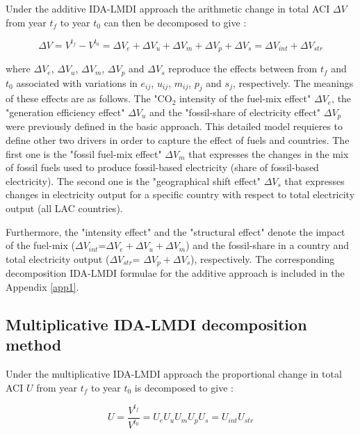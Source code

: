 \documentclass[energies,article,accept,moreauthors,12pt,a4paper]{mdpi} %
\begin{document}
Under the additive IDA-LMDI approach the arithmetic change in total ACI
$\Delta V$ from year $t_f$ to year $t_0$ can then be decomposed to give \cite{ang2016}:

\begin{equation}\label{dvtot}
  \Delta V   =  V^{t_f}- V^{t_0} = \Delta V_{e} + \Delta V_{u}+
  \Delta V_{m} + \Delta V_{p}  + \Delta V_{s} = \Delta V_{int}+\Delta V_{str}
\end{equation}

\noindent where $\Delta V_{e}$, $\Delta V_{u}$, $\Delta V_{m}$, $\Delta V_{p}$  and $\Delta V_{s}$ reproduce the effects between from ${t_f}$ and ${t_0}$ associated with variations in $e_{ij}$, $u_{ij}$, $m_{ij}$, $p_{j}$ and $s_{j}$, respectively.   The meanings of these effects are as follows. The "CO$_2$ intensity of the fuel-mix effect" $\Delta V_{e}$, the "generation efficiency effect" $\Delta V_{u}$ and the "fossil-share of electricity effect" $\Delta V_{p}$ were previously defined in the basic approach. This detailed model requieres to define other two drivers in order to capture the effect of fuels and countries.  The first one is the "fossil fuel-mix effect" $\Delta V_{m}$ that expresses the  changes in the mix of fossil fuels used to produce fossil-based electricity (share of fossil-based electricity). The second one is the "geographical shift effect" $\Delta V_{s}$ that expresses  changes in electricity output for a specific country with respect to total electricity output (all LAC countries).

Furthermore, the "intensity effect" and the "structural effect" denote the impact of the fuel-mix ($\Delta V_{int}$=$\Delta V_{e} + \Delta V_{u}+ \Delta V_{m}$) and the fossil-share in a country and total electricity output ($\Delta V_{str}$= $  \Delta V_{p}  + \Delta V_{s}$), respectively.  The corresponding decomposition IDA-LMDI formulae for the additive approach is included in the Appendix \ref{app1}.

\subsection{Multiplicative IDA-LMDI decomposition method}\label{amm2}

 Under the multiplicative IDA-LMDI approach the proportional change in total ACI
$U$ from year $t_f$ to year $t_0$ is decomposed to give \cite{ang2016}:

\begin{equation}
  U   = \frac{ V^{t_f}}{ V^{t_0}} = U_{e} U_{u} U_{m} U_{p} U_{s} = U_{int}U_{str}
\end{equation}
\end{document}

